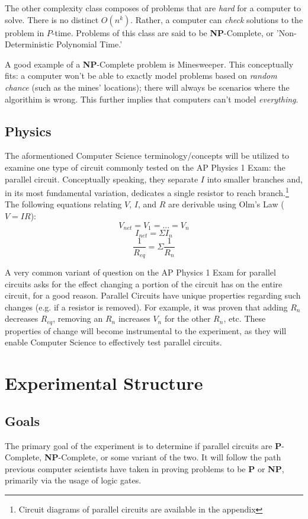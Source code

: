 \documentclass{article}
\begin{document}
The other complexity class composes of problems that are \textit{hard} for a computer to solve. There is no distinct $O(n^{k})$. Rather, a computer can \textit{check} solutions to the problem in $P$-time. Problems of this class are said to be \textbf{NP}-Complete, or 'Non-Deterministic Polynomial Time.' %

A good example of a \textbf{NP}-Complete problem is Minesweeper. This conceptually fits: a computer won't be able to exactly model problems based on \textit{random chance} (such as the mines' locations); there will always be scenarios where the algorithim is wrong.\cite{mine} This further implies that computers can't model \textit{everything}. 
\subsection{Physics}
The aformentioned Computer Science terminology/concepts will be utilized to examine one type of circuit commonly tested on the AP Physics 1 Exam: the parallel circuit.\cite{college} Conceptually speaking, they separate $I$ into smaller branches and, in its most fundamental variation, dedicates a single resistor to reach branch.\footnote{Circuit diagrams of parallel circuits are available in the appendix}%
 The following equations relating $V$, $I$, and $R$ are derivable using Olm's Law ($V=IR$): %
$$V_{net}=V_{1}=...=V_{n}$$
$$I_{net}= \Sigma I_{n}$$
$$\frac{1}{R_{eq}} = \Sigma \frac{1}{R_{n}}$$

A very common variant of question on the AP Physics 1 Exam for parallel circuits asks for the effect changing a portion of the circuit has on the entire circuit, for a good reason. Parallel Circuits have unique properties regarding such changes (e.g. if a resistor is removed). For example, it was proven that adding $R_{n}$ decreases $R_{eq}$, removing an $R_{n}$ increases $V_{n}$ for the other $R_{n}$, etc. %
These properties of change will become instrumental to the experiment, as they will enable Computer Science to effectively test parallel circuits.
\section{Experimental Structure}
\subsection{Goals}
The primary goal of the experiment is to determine if parallel circuits are \textbf{P}-Complete, \textbf{NP}-Complete, or some variant of the two. It will follow the path previous computer scientists have taken in proving problems to be \textbf{P} or \textbf{NP}\cite{mine}, primarily via the usage of logic gates. 
\end{document}
